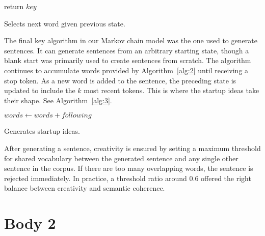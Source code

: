 \documentclass[11pt]{article}
\begin{document}
\begin{algorithm}
  \begin{algorithmic}

        {return $key$}
      \EndIf
    \EndFor
    \EndProcedure{}
  \end{algorithmic}
  \caption{Selects next word given previous state.}
  \label{alg:2}
\end{algorithm}

The final key algorithm in our Markov chain model was the one used to generate sentences. It can generate sentences from an arbitrary starting state, though a blank start was primarily used to create sentences from scratch. The algorithm continues to accumulate words provided by Algorithm~\ref{alg:2} until receiving a stop token. As a new word is added to the sentence, the preceding state is updated to include the \(k\) most recent tokens. This is where the startup ideas take their shape. See Algorithm~\ref{alg:3}.

\begin{algorithm}
  \begin{algorithmic}

        {$words \gets words + following$}
      \EndIf
    \EndWhile
    \EndProcedure{}
  \end{algorithmic}
  \caption{Generates startup ideas.}
  \label{alg:3}
\end{algorithm}

After generating a sentence, creativity is ensured by setting a maximum threshold for shared vocabulary between the generated sentence and any single other sentence in the corpus. If there are too many overlapping words, the sentence is rejected immediately. In practice, a threshold ratio around 0.6 offered the right balance between creativity and semantic coherence.

\section{Body 2}
\end{document}
